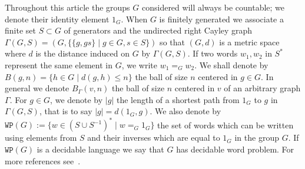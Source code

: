 \documentclass[letterpaper]{article}
\theoremstyle{plain}
\newcommand{\cor}[2][]{#2}
\begin{document}
	Throughout this article the groups $G$ considered will \cor[be either countable or finitely generated]{always be countable}; we denote their identity element $1_G$. When $G$ is finitely generated we associate a finite set $S\subset G$ of generators and the undirected right Cayley graph $\Gamma(G,S) = (G, \{ \{g,gs\} \mid g \in G, s\in S\})$ so that $(G,d)$ is a metric space where $d$ is the distance induced on $G$ by $\Gamma(G,S)$. \cor{If two words $w_1,w_2$ in $S^*$ represent the same element in $G$, we write $w_1 =_G w_2$.} We shall denote by $B(g,n) = \{h \in G \mid d(g,h) \leq n\}$ the ball of size $n$ centered in $g \in G$. In general we denote $B_{\Gamma}(v,n)$ the ball of size $n$ centered in $v$ of an arbitrary graph $\Gamma$. \cor{For $g\in G$, we denote by $|g|$ the length of a shortest path from $1_G$ to $g$ in $\Gamma(G,S)$, that is to say $|g|=d(1_G,g)$.} We also denote by $\texttt{WP}(G) := \{ w \in (S\cup S^{-1})^{*} \mid w =_G 1_G \}$ the set of words which can be written using elements 
from $S$ and their inverses which are equal to $1_G$ in the group $G$. If $\texttt{WP}(G)$ is a decidable language we say that $G$ has decidable word problem. For more references see~\cite{MagnusKarassSolitar2004}.
	
\end{document}
